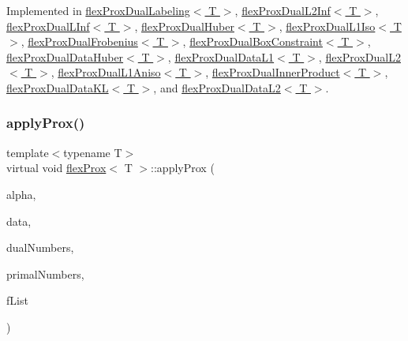Implemented in \hyperlink{classflex_prox_dual_labeling_a29e89f413ea586b9390da273141c823b}{flex\+Prox\+Dual\+Labeling$<$ T $>$}, \hyperlink{classflex_prox_dual_l2_inf_a9462624e3c2cf958ea396b18d1773f9a}{flex\+Prox\+Dual\+L2\+Inf$<$ T $>$}, \hyperlink{classflex_prox_dual_l_inf_a90e3ad5244d8bf6cef50541593fb9da0}{flex\+Prox\+Dual\+L\+Inf$<$ T $>$}, \hyperlink{classflex_prox_dual_huber_af1e80a4361cda51e2b51aceeb69c6b79}{flex\+Prox\+Dual\+Huber$<$ T $>$}, \hyperlink{classflex_prox_dual_l1_iso_afbf9d355a5c633355233f6b7d6026465}{flex\+Prox\+Dual\+L1\+Iso$<$ T $>$}, \hyperlink{classflex_prox_dual_frobenius_a08de45a25d007ea87379641d027fd228}{flex\+Prox\+Dual\+Frobenius$<$ T $>$}, \hyperlink{classflex_prox_dual_box_constraint_a53df35f535f7df3da4e24f6190be2f7f}{flex\+Prox\+Dual\+Box\+Constraint$<$ T $>$}, \hyperlink{classflex_prox_dual_data_huber_ac085f34619c3d747b09a2b369a11dcd5}{flex\+Prox\+Dual\+Data\+Huber$<$ T $>$}, \hyperlink{classflex_prox_dual_data_l1_a8ebb08fae14a70bc6ed15b6d75b67705}{flex\+Prox\+Dual\+Data\+L1$<$ T $>$}, \hyperlink{classflex_prox_dual_l2_ad4574da3855bad6596c8a3fda028c933}{flex\+Prox\+Dual\+L2$<$ T $>$}, \hyperlink{classflex_prox_dual_l1_aniso_afef01f75247ba5a8990c5b77a7ab89f0}{flex\+Prox\+Dual\+L1\+Aniso$<$ T $>$}, \hyperlink{classflex_prox_dual_inner_product_ac12298c520f5e8e81724e330e8dae6a3}{flex\+Prox\+Dual\+Inner\+Product$<$ T $>$}, \hyperlink{classflex_prox_dual_data_k_l_ad6314cbdf307759e3176e26b3efba7c6}{flex\+Prox\+Dual\+Data\+K\+L$<$ T $>$}, and \hyperlink{classflex_prox_dual_data_l2_ae3ee176dc6c05e8fba0df96c73b10464}{flex\+Prox\+Dual\+Data\+L2$<$ T $>$}.

\mbox{\label{classflex_prox_aec433ffbf1a7586f26a2116c6b94bdd6}} 
\subsubsection{\texorpdfstring{apply\+Prox()}{applyProx()}\hspace{0.1cm}{\footnotesize\ttfamily [2/2]}}
{\footnotesize\ttfamily template$<$typename T$>$ \\
virtual void \hyperlink{classflex_prox}{flex\+Prox}$<$ T $>$\+::apply\+Prox (\begin{DoxyParamCaption}\item[{T}]{alpha,  }\item[{\hyperlink{classflex_box_data}{flex\+Box\+Data}$<$ T $>$ $\ast$}]{data,  }\item[{const std\+::vector$<$ int $>$ \&}]{dual\+Numbers,  }\item[{const std\+::vector$<$ int $>$ \&}]{primal\+Numbers,  }\item[{std\+::vector$<$ Tdata $>$ \&}]{f\+List }\end{DoxyParamCaption})\hspace{0.3cm}{\ttfamily [pure virtual]}}



